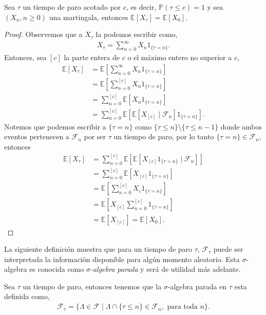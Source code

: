 \begin{proposition} 
\label{espconst}
	Sea $\tau$ un tiempo de paro acotado por $c$, es decir, $\mathbb{P}(\tau \leq c) = 1$ y sea $(X_n, n \geq 0)$ una martingala, entonces  $\mathbb{E}[X_{\tau}] = \mathbb{E}[X_0]$.
\end{proposition}
\begin{proof}
	Observemos que a $X_{\tau}$ la podemos escribir como,
	\begin{align*}
		X_{\tau} = \sum_{n=0}^{\infty} X_n1_{ \{\tau = n\} }.
	\end{align*}
	Entonces, sea $[c]$ la parte entera de $c$ o el máximo entero no superior a $c$,
	\begin{align*}
		\mathbb{E}[X_{\tau}] & = \mathbb{E}\left[\sum_{n=0}^{\infty} X_n 1_{ \{\tau = n\} } \right] \\
		& = \mathbb{E}\left[\sum_{n=0}^{[c]} X_n  1_{ \{\tau = n\} }\right] \\
		& = \sum_{n=0}^{[c]} \mathbb{E}[X_n 1_{ \{\tau = n\} }] \\
		& = \sum_{n=0}^{[c]} \mathbb{E}[\mathbb{E}[X_[c] \mid \mathcal{F}_n] 1_{ \{\tau = n\} }].
	\end{align*}
	Notemos que podemos escribir a $\{ \tau = n\}$ como $\{ \tau \leq n\} \setminus \{ \tau \leq n-1\}$ donde ambos eventos pertenecen a $\mathcal{F}_n$ por ser $\tau$ un tiempo de paro, por lo tanto $\{ \tau = n\} \in \mathcal{F}_n$, entonces
	\begin{align*}
		 \mathbb{E}[X_{\tau}] & = \sum_{n=0}^{[c]} \mathbb{E}[\mathbb{E}[X_{[c]} 1_{ \{\tau = n\} } \mid \mathcal{F}_n]] \\
		 & = \sum_{n=0}^{[c]} \mathbb{E}[X_{[c]}  1_{ \{\tau = n\} }] \\
		 & = \mathbb{E}\left[\sum_{n=0}^{[c]} X_c 1_{ \{\tau = n\} }\right] \\
		 & = \mathbb{E}\left[X_{[c]}  \sum_{n=0}^{[c]} 1_{ \{\tau = n\} }\right] \\
		 & = \mathbb{E}[X_{[c]}] = \mathbb{E}[X_0].
	\end{align*}
\end{proof}

La siguiente definición muestra que para un tiempo de paro $\tau$, $\mathcal{F}_{\tau}$ puede ser interpretada la información disponible para algún momento aleatorio. Esta $\sigma$-algebra es conocida como \emph{$\sigma$-algebra parada} y será de utilidad más adelante.

\begin{definition}  \label{algebraaleatoria}
	Sea $\tau$ un tiempo de paro, entonces tenemos que la $\sigma$-algebra parada en $\tau$ esta definida como,
	\begin{align*}
	\mathcal{F}_{\tau} = \{ \Lambda \in \mathcal{F} \mid \Lambda \cap \{ \tau \leq n \} \in \mathcal{F}_n, \text{ para toda } n \}.
	\end{align*}
\end{definition}

